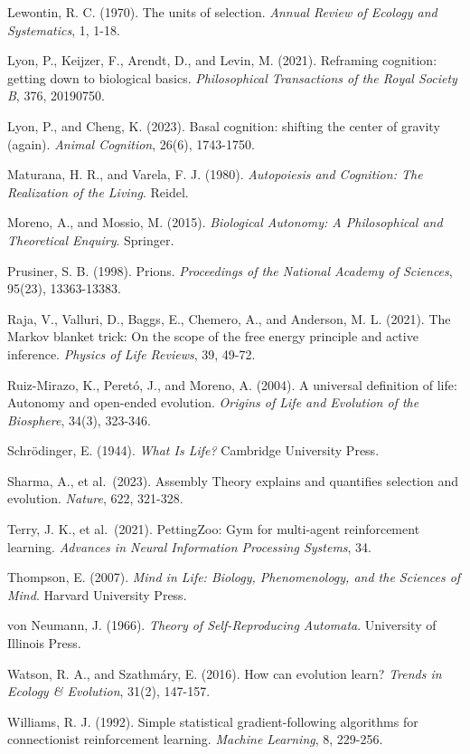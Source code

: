 \documentclass[Afour,sageh,times,doublespace]{sagej}
\begin{document}
Lewontin, R. C. (1970). The units of selection. \emph{Annual Review of Ecology and Systematics}, 1, 1-18.

Lyon, P., Keijzer, F., Arendt, D., and Levin, M. (2021). Reframing cognition: getting down to biological basics. \emph{Philosophical Transactions of the Royal Society B}, 376, 20190750.

Lyon, P., and Cheng, K. (2023). Basal cognition: shifting the center of gravity (again). \emph{Animal Cognition}, 26(6), 1743-1750.

Maturana, H. R., and Varela, F. J. (1980). \emph{Autopoiesis and Cognition: The Realization of the Living}. Reidel.

Moreno, A., and Mossio, M. (2015). \emph{Biological Autonomy: A Philosophical and Theoretical Enquiry}. Springer.

Prusiner, S. B. (1998). Prions. \emph{Proceedings of the National Academy of Sciences}, 95(23), 13363-13383.

Raja, V., Valluri, D., Baggs, E., Chemero, A., and Anderson, M. L. (2021). The Markov blanket trick: On the scope of the free energy principle and active inference. \emph{Physics of Life Reviews}, 39, 49-72.

Ruiz-Mirazo, K., Peretó, J., and Moreno, A. (2004). A universal definition of life: Autonomy and open-ended evolution. \emph{Origins of Life and Evolution of the Biosphere}, 34(3), 323-346.

Schrödinger, E. (1944). \emph{What Is Life?} Cambridge University Press.

Sharma, A., et al.~(2023). Assembly Theory explains and quantifies selection and evolution. \emph{Nature}, 622, 321-328.

Terry, J. K., et al.~(2021). PettingZoo: Gym for multi-agent reinforcement learning. \emph{Advances in Neural Information Processing Systems}, 34.

Thompson, E. (2007). \emph{Mind in Life: Biology, Phenomenology, and the Sciences of Mind}. Harvard University Press.

von Neumann, J. (1966). \emph{Theory of Self-Reproducing Automata}. University of Illinois Press.

Watson, R. A., and Szathmáry, E. (2016). How can evolution learn? \emph{Trends in Ecology \& Evolution}, 31(2), 147-157.

Williams, R. J. (1992). Simple statistical gradient-following algorithms for connectionist reinforcement learning. \emph{Machine Learning}, 8, 229-256.
\end{document}
